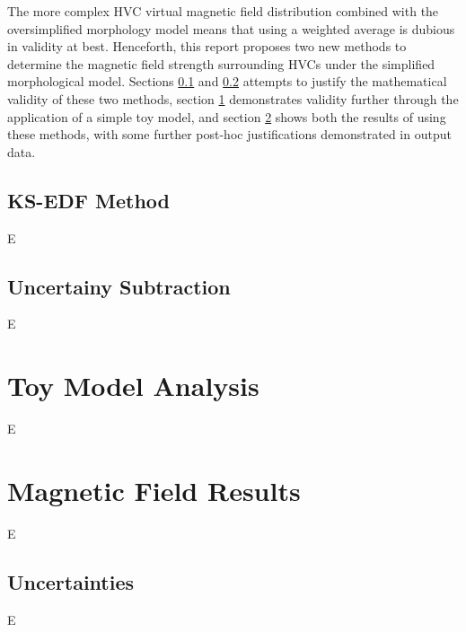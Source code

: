 The more complex HVC virtual magnetic field distribution combined with the oversimplified morphology model means that using a weighted average is dubious in validity at best. Henceforth, this report proposes two new methods to determine the magnetic field strength surrounding HVCs under the simplified morphological model. Sections \ref{ssec:KS_EDF} and \ref{ssec:sigma_sub} attempts to justify the mathematical validity of these two methods, section \ref{sec:toy_models} demonstrates validity further through the application of a simple toy model, and section \ref{sec:results} shows both the results of using these methods, with some further post-hoc justifications demonstrated in output data.


\subsection{KS-EDF Method}
\label{ssec:KS_EDF}

E

\subsection{Uncertainy Subtraction}
\label{ssec:sigma_sub}

E

\section{Toy Model Analysis}
\label{sec:toy_models}

E

\section{Magnetic Field Results}
\label{sec:results}

E

\subsection{Uncertainties}
\label{ssec:results_uncertainties}

E


